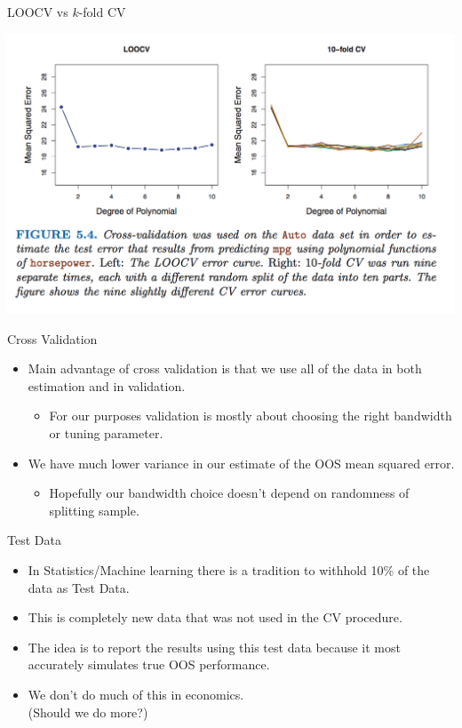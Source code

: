 \begin{frame}{LOOCV vs $k$-fold CV}
  \begin{center}
  \includegraphics[width=\textwidth]{./resources/comparison-cv}
  \end{center}
\end{frame}
  
\begin{frame}{Cross Validation}
  \begin{itemize}
  \item Main advantage of cross validation is that we use all of the data in both \alert{estimation} and in \alert{validation}.
  \begin{itemize}
  \item For our purposes validation is mostly about choosing the right bandwidth or tuning parameter.
  \end{itemize}
  \item We have much lower variance in our estimate of the OOS mean squared error.
  \begin{itemize}
  \item Hopefully our bandwidth choice doesn't depend on randomness of splitting sample.
  \end{itemize}
  \end{itemize}
\end{frame}
  
  
\begin{frame}{Test Data}
  \begin{itemize}
  \item In Statistics/Machine learning there is a tradition to withhold 10\% of the data as \alert{Test Data}.
  \item This is \alert{completely new data} that was not used in the CV procedure.
  \item The idea is to report the results using this test data because it most accurately simulates true OOS performance.
  \item We don't do much of this in economics.\\
   (Should we do more?)
  \end{itemize}
\end{frame}


